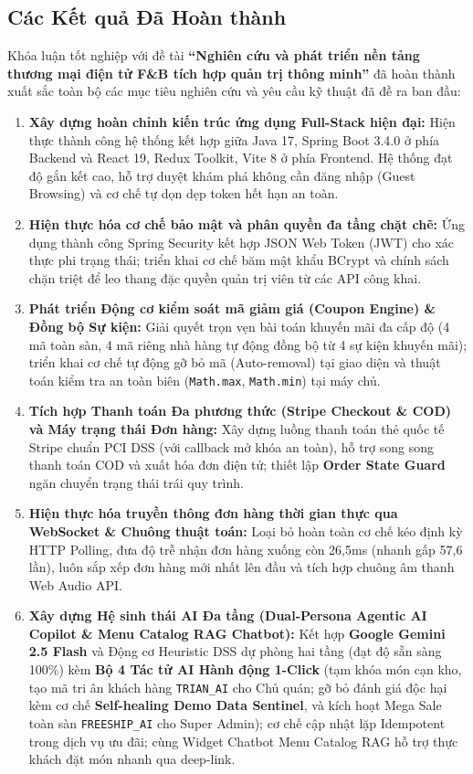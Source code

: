 \documentclass{uetgraduation}
\begin{document}
\subsection{Các Kết quả Đã Hoàn thành}
Khóa luận tốt nghiệp với đề tài \textbf{``Nghiên cứu và phát triển nền tảng thương mại điện tử F\&B tích hợp quản trị thông minh''} đã hoàn thành xuất sắc toàn bộ các mục tiêu nghiên cứu và yêu cầu kỹ thuật đã đề ra ban đầu:
\begin{enumerate}
    \item \textbf{Xây dựng hoàn chỉnh kiến trúc ứng dụng Full-Stack hiện đại:} Hiện thực thành công hệ thống kết hợp giữa Java 17, Spring Boot 3.4.0 ở phía Backend và React 19, Redux Toolkit, Vite 8 ở phía Frontend. Hệ thống đạt độ gắn kết cao, hỗ trợ duyệt khám phá không cần đăng nhập (Guest Browsing) và cơ chế tự dọn dẹp token hết hạn an toàn.
    \item \textbf{Hiện thực hóa cơ chế bảo mật và phân quyền đa tầng chặt chẽ:} Ứng dụng thành công Spring Security kết hợp JSON Web Token (JWT) cho xác thực phi trạng thái; triển khai cơ chế băm mật khẩu BCrypt và chính sách chặn triệt để leo thang đặc quyền quản trị viên từ các API công khai.
    \item \textbf{Phát triển Động cơ kiểm soát mã giảm giá (Coupon Engine) \& Đồng bộ Sự kiện:} Giải quyết trọn vẹn bài toán khuyến mãi đa cấp độ (4 mã toàn sàn, 4 mã riêng nhà hàng tự động đồng bộ từ 4 sự kiện khuyến mãi); triển khai cơ chế tự động gỡ bỏ mã (Auto-removal) tại giao diện và thuật toán kiểm tra an toàn biên (\texttt{Math.max}, \texttt{Math.min}) tại máy chủ.
    \item \textbf{Tích hợp Thanh toán Đa phương thức (Stripe Checkout \& COD) và Máy trạng thái Đơn hàng:} Xây dựng luồng thanh toán thẻ quốc tế Stripe chuẩn PCI DSS (với callback mở khóa an toàn), hỗ trợ song song thanh toán COD và xuất hóa đơn điện tử; thiết lập \textbf{Order State Guard} ngăn chuyển trạng thái trái quy trình.
    \item \textbf{Hiện thực hóa truyền thông đơn hàng thời gian thực qua WebSocket \& Chuông thuật toán:} Loại bỏ hoàn toàn cơ chế kéo định kỳ HTTP Polling, đưa độ trễ nhận đơn hàng xuống còn 26,5ms (nhanh gấp 57,6 lần), luôn sắp xếp đơn hàng mới nhất lên đầu và tích hợp chuông âm thanh Web Audio API.
    \item \textbf{Xây dựng Hệ sinh thái AI Đa tầng (Dual-Persona Agentic AI Copilot \& Menu Catalog RAG Chatbot):} Kết hợp \textbf{Google Gemini 2.5 Flash} và Động cơ Heuristic DSS dự phòng hai tầng (đạt độ sẵn sàng 100\%) kèm \textbf{Bộ 4 Tác tử AI Hành động 1-Click} (tạm khóa món cạn kho, tạo mã tri ân khách hàng \texttt{TRIAN\_AI} cho Chủ quán; gỡ bỏ đánh giá độc hại kèm cơ chế \textbf{Self-healing Demo Data Sentinel}, và kích hoạt Mega Sale toàn sàn \texttt{FREESHIP\_AI} cho Super Admin); cơ chế cập nhật lặp Idempotent trong dịch vụ ưu đãi; cùng Widget Chatbot Menu Catalog RAG hỗ trợ thực khách đặt món nhanh qua deep-link.

\end{enumerate}
\end{document}
